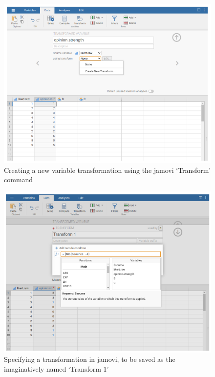 \documentclass[
]{book}
\begin{document}
\begin{figure}
\includegraphics[width=0.9\linewidth]{images/Figure38} \caption{Creating a new variable transformation using the jamovi ‘Transform’ command}\label{fig:fig6-7}
\end{figure}

\begin{figure}
\includegraphics[width=0.9\linewidth]{images/Figure39} \caption{Specifying a transformation in jamovi, to be saved as the imaginatively named ‘Transform 1’}\label{fig:fig6-8}
\end{figure}
\end{document}

